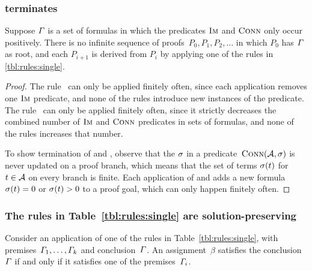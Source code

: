 \documentclass[acmsmall,review,anonymous,screen]{acmart}\settopmatter{printfolios=true,printccs=true,printacmref=true}
\theoremstyle{definition}
\begin{document}
\subsubsection{\Calculus{} terminates}
\begin{lemma}\label{lma:single-terminates}
  Suppose $\varGamma{}$ is a set of formulas in which the predicates
  $\operatorname{\textsc{Im}}$ and $\operatorname{\textsc{Conn}}$ only occur positively. There is no
  infinite sequence of proofs~$P_0, P_1, P_2, \ldots$ in which $P_0$
  has $\varGamma{}$ as root, and each $P_{i+1}$ is derived from
  $P_i$ by applying one of the rules in \cref{tbl:rules:single}.
\end{lemma}

\begin{proof}
  The rule~\Expand{} can only be applied finitely often, since each
  application removes one $\operatorname{\textsc{Im}}$ predicate, and none of the rules
  introduce new instances of the predicate. The rule~\Subsume{} can
  only be applied finitely often, since it strictly decreases the
  combined number of $\operatorname{\textsc{Im}}$ and $\operatorname{\textsc{Conn}}$ predicates in sets of
  formulas, and none of the rules increases that number.

  To show termination of \Split{} and \Propagate{}, observe that the
  $\operatorname{\sigma}$ in a predicate~$\operatorname{\textsc{Conn}}(\mathcal{A}, \operatorname{\sigma})$ is never
  updated on a proof branch, which means that the set of terms
  $\operatorname{\sigma}(t)$ for $t \in \mathcal{A}$ on every branch is finite. Each
  application of \Split{} and \Propagate{} adds a new
  formula~$\operatorname{\sigma}(t) = 0$ or $\operatorname{\sigma}(t) > 0$
  to a proof goal, which can only happen finitely often.
\end{proof}

\subsubsection{The rules in Table~\ref{tbl:rules:single} are solution-preserving}

\begin{lemma}\label{lma:single-correct}
  Consider an application of one of the rules in
  Table~\ref{tbl:rules:single}, with
  premises~$\varGamma_1, \ldots, \varGamma_k$ and
  conclusion~$\varGamma$. An assignment~$\beta$ satisfies the
  conclusion~$\varGamma$ if and only if it satisfies one of the
  premises~$\varGamma_i$.
\end{lemma}
\end{document}
